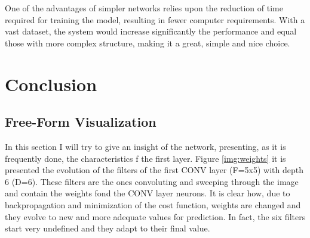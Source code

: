 \documentclass[]{article}
\begin{document}
One of the advantages of simpler networks relies upon the reduction of time required for training the model, resulting in fewer computer requirements. With a vast dataset, the system would increase significantly the performance and equal those with more complex structure, making it a great, simple and nice choice. %


\section{Conclusion}\label{v.-conclusion}


\subsection{Free-Form Visualization}\label{free-form-visualization}

\renewcommand{\lr}{0.0005}
In this section I will try to give an insight of the network, presenting, as it is frequently done, the characteristics f the first layer. Figure \ref{img:weights} it is presented the evolution of the filters of the first CONV layer (F=5x5) with depth 6 (D=6). These filters are the ones convoluting and sweeping through the image and contain the weights fond the CONV layer neurons. It is clear how, due to backpropagation and minimization of the cost function, weights are changed and they evolve to new and more adequate values for prediction. In fact, the six filters start very undefined and they adapt to their final value. 
\end{document}
